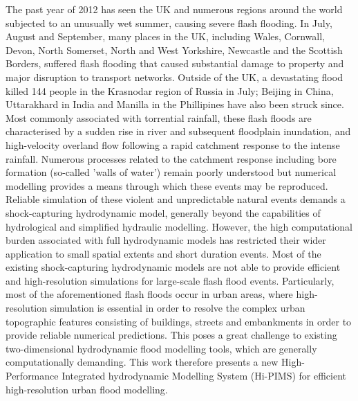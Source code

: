 \documentclass[11pt,english,a4paper]{article}
\begin{document}
The past year of 2012 has seen the UK and numerous regions around the world subjected to an unusually wet summer, causing severe flash flooding. In July, August and September, many places in the UK, including Wales, Cornwall, Devon, North Somerset, North and West Yorkshire, Newcastle and the Scottish Borders, suffered flash flooding that caused substantial damage to property and major disruption to transport networks. Outside of the UK, a devastating flood killed 144 people in the Krasnodar region of Russia in July; Beijing in China, Uttarakhard in India and Manilla in the Phillipines have also been struck since. Most commonly associated with torrential rainfall, these flash floods are characterised by a sudden rise in river and subsequent floodplain inundation, and high-velocity overland flow following a rapid catchment response to the intense rainfall. Numerous processes related to the catchment response including bore formation (so-called 'walls of water') remain poorly understood but numerical modelling provides a means through which these events may be reproduced. Reliable simulation of these violent and unpredictable natural events demands a shock-capturing hydrodynamic model, generally beyond the capabilities of hydrological and simplified hydraulic modelling. However, the high computational burden associated with full hydrodynamic models has restricted their wider application to small spatial extents and short duration events. Most of the existing shock-capturing hydrodynamic models are not able to provide efficient and high-resolution simulations for large-scale flash flood events. Particularly, most of the aforementioned flash floods occur in urban areas, where high-resolution simulation is essential in order to resolve the complex urban topographic features consisting of buildings, streets and embankments in order to provide reliable numerical predictions. This poses a great challenge to existing two-dimensional hydrodynamic flood modelling tools, which are generally computationally demanding. This work therefore presents a new High-Performance Integrated hydrodynamic Modelling System (Hi-PIMS) for efficient high-resolution urban flood modelling.
\end{document}
